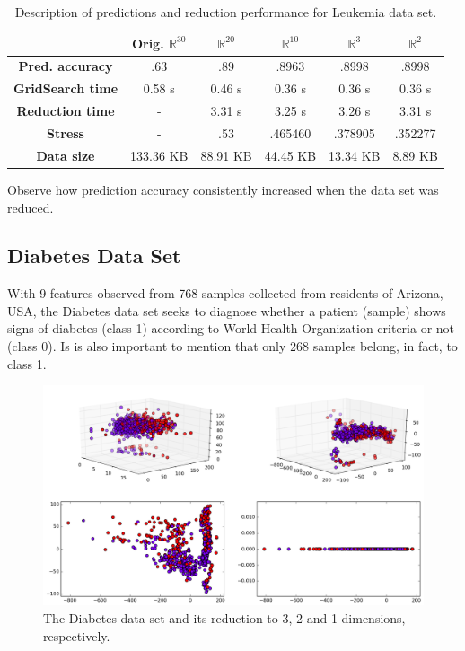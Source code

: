 \documentclass[12pt]{report}
\begin{document}
\begin{table}[H]
	\centering
	\begin{tabular}{|c|c|c|c|c|c|}
		\hline
		& \textbf{Orig. $\mathbb{R}^{30}$} & \textbf{$\mathbb{R}^{20}$} & \textbf{$\mathbb{R}^{10}$} & \textbf{$\mathbb{R}^{3}$} & \textbf{$\mathbb{R}^{2}$} \\\hline
		\textbf{Pred. accuracy}    & .63 & .89 & .8963 & .8998  & .8998 \\\hline
		\textbf{GridSearch time}   & 0.58 s & 0.46 s & 0.36 s & 0.36 s & 0.36 s \\\hline
		\textbf{Reduction time}    & - & 3.31 s & 3.25 s & 3.26 s & 3.31 s \\\hline
		\textbf{Stress} & - & .53 & .465460 & .378905 & .352277 \\\hline
		\textbf{Data size}  & 133.36 KB & 88.91 KB & 44.45 KB & 13.34 KB & 8.89 KB \\\hline
	\end{tabular}
	\captionsetup{justification=centering}
	\caption{Description of predictions and reduction performance for Leukemia data set.}
\end{table}

Observe how prediction accuracy consistently increased when the data set was reduced.

\newpage
\subsection{Diabetes Data Set}

With 9 features observed from 768 samples collected from residents of Arizona, USA, the Diabetes data set seeks to diagnose whether a patient (sample) shows signs of diabetes (class 1) according to World Health Organization criteria or not (class 0). Is is also important to mention that only 268 samples belong, in fact, to class 1.

\begin{figure}[H]
	\centering
	\includegraphics[width=.85\linewidth]{img/experiments/iso_diabetes}
	\captionsetup{justification=centering}
	\caption{The Diabetes data set and its reduction to 3, 2 and 1 dimensions, respectively.}
	\label{fig:iso_diabetes}
\end{figure}
\end{document}
